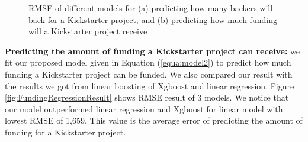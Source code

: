\begin{figure}[!ht]
	\centering
	\hspace{1cm}
	\caption{RMSE of different models for (a) predicting how many backers will back for a Kickstarter project, and (b) predicting how much funding will a Kickstarter project receive}
	\label{fig:RegressionResult}
	\vspace{-10pt}
\end{figure}

\textbf{Predicting the amount of funding a Kickstarter project can receive:} we fit our proposed model given in Equation (\ref{equa:model2}) to predict how much funding a Kickstarter project can be funded. We also compared our result with the results we got from linear boosting of Xgboost and linear regression. Figure \ref{fig:FundingRegressionResult} shows RMSE result of 3 models. We notice that our model outperformed linear regression and Xgboost for linear model with lowest RMSE of 1,659. This value is the average error of predicting the amount of funding for a Kickstarter project. 


